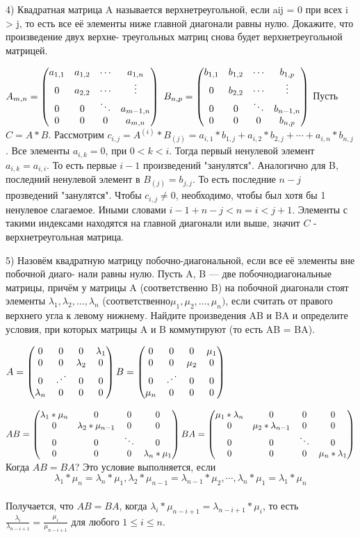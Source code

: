 \documentclass[12pt, a4paper]{article}
\begin{document}
	4) Квадратная матрица A называется верхнетреугольной, если aij = 0 при всех i > j, то есть все её элементы ниже главной диагонали равны нулю. Докажите, что произведение двух верхне- треугольных матриц снова будет верхнетреугольной матрицей. \bspace
	
	$A_{m, n} = \mtrfor{\rowfor{a_{1,1}}{a_{1,2}}{\cdots}{a_{1,n}}}{\rowfor{0}{a_{2,2}}{\cdots}{\vdots}}{\rowfor{0}{0}{\ddots}{a_{m - 1,n}}}{\rowfor{0}{0}{0}{a_{m,n}}}$ $B_{n, p} = \mtrfor{\rowfor{b_{1,1}}{b_{1,2}}{\cdots}{b_{1,p}}}{\rowfor{0}{b_{2,2}}{\cdots}{\vdots}}{\rowfor{0}{0}{\ddots}{b_{n - 1,n}}}{\rowfor{0}{0}{0}{b_{n,p}}}$ \bspace
	Пусть $C = A * B$. Рассмотрим $c_{i, j} = A ^ {(i)} * B_{(j)} = a_{i, 1} * b_{1, j} + a_{i, 2} * b_{2, j} + \cdots + a_{i, n} * b_{n, j}$. Все элементы $a_{i, k} = 0$, при $0 < k < i$. Тогда первый ненулевой элемент $a_{i, k} = a_{i,i}$. То есть первые $i - 1$ произведений "занулятся". Аналогично для B, последний ненулевой элемент в $B_{(j)} = b_{j,j}$. То есть последние $n - j$ прозведений "занулятся". Чтобы $c_{i,j} \neq 0$, необходимо, чтобы был хотя бы 1 ненулевое слагаемое. Иными словами $i  - 1 + n - j < n = i < j + 1$. Элементы с такими индексами находятся на главной диагонали или выше, значит $C$ - верхнетреугольная матрица. \bspace
	
	5) Назовём квадратную матрицу побочно-диагональной, если все её элементы вне побочной диаго- нали равны нулю. Пусть A, B — две побочнодиагональные матрицы, причём у матрицы A (соответственно B) на побочной диагонали стоят элементы $\lambda_1, \lambda_2, . . . , \lambda_n$ (соответственно$ \mu_1, \mu_2, . . . , \mu_n)$, если считать от правого верхнего угла к левому нижнему. Найдите произведения AB и BA и определите условия, при которых матрицы A и B коммутируют (то есть AB = BA). \bspace
	
	$A = \begin{pmatrix} 0 &0 &0 &\lambda_1 \\0 &0 &\lambda_2 &0 \\ 0 &\iddots &0 &0 \\ \lambda_n &0 &0 &0 \end{pmatrix} 
	B = \begin{pmatrix} 0 &0 &0 &\mu_1 \\0 &0 &\mu_2 &0 \\ 0 &\iddots &0 &0 \\ \mu_n &0 &0 &0 \end{pmatrix} 
	$\bspace
	
	$
	AB = \begin{pmatrix} \lambda_1 * \mu_n &0 &0 &0 \\0 &\lambda_2 * \mu_{n - 1} &0 &0 \\ 0 &0 &\ddots &0 \\ 0 &0 &0 &\lambda_n * \mu_1 \end{pmatrix}    
	BA =  \begin{pmatrix} \mu_1 * \lambda_n &0 &0 &0 \\0 &\mu_2 * \lambda_{n - 1} &0 &0 \\ 0 &0 &\ddots &0 \\ 0 &0 &0 &\mu_n * \lambda_1 \end{pmatrix} 
	$\bspace
	Когда $AB = BA$? Это условие выполняется, если \\
	 \[\lambda_1 * \mu_n = \lambda_n * \mu_1, \lambda_2 * \mu_{n - 1} = \lambda_{n - 1} * \mu_2, \cdots, \lambda_{n} * \mu_1 = \lambda_1 * \mu_n \]\\
	Получается, что $AB = BA$, когда $\lambda_i * \mu_{n - i + 1} = \lambda_{n - i + 1} * \mu_i$, то есть $\frac{\lambda_i}{\lambda_{n - i + 1}} = \frac{\mu_i}{\mu_{n - i + 1}}$ для любого $1 \leq i \leq n$. \bspace
	
\end{document}
